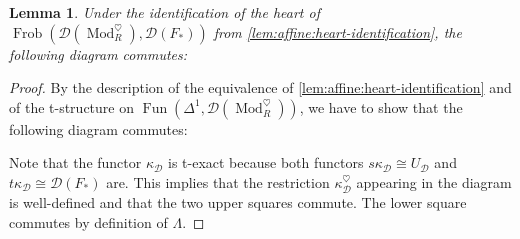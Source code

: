 \documentclass{article}
\theoremstyle{definition}
\theoremstyle{definition}
\theoremstyle{definition}
\theoremstyle{plain}
\newtheorem{lem}[defn]{Lemma}
\theoremstyle{plain}
\theoremstyle{plain}
\theoremstyle{plain}
\theoremstyle{plain}
\theoremstyle{plain}
\theoremstyle{plain}
\theoremstyle{plain}
\theoremstyle{remark}
\theoremstyle{remark}
\theoremstyle{plain}
\theoremstyle{plain}
\theoremstyle{plain}
\theoremstyle{plain}
\theoremstyle{plain}
\newcommand{\ModDisc}[1]{\operatorname{Mod}_{#1}^{\heartsuit}}
\newcommand{\Frob}[2]{\operatorname{Frob}(#1, #2)}
\newcommand{\Cat}[1]{\mathcal{#1}}
\newcommand{\Fun}[2]{\operatorname{Fun}({#1},{#2})}
\begin{document}
\begin{lem} \label{lem:affine:kappa-heart}
    Under the identification of the heart of $\Frob{\Cat D(\ModDisc{R})}{\Cat D(F_*)}$ from \cref{lem:affine:heart-identification},
    the following diagram commutes:
    \begin{center}
    \end{center}
\end{lem}
\begin{proof}
    By the description of the equivalence of \cref{lem:affine:heart-identification} and of the t-structure on $\Fun{\Delta^1}{\Cat D(\ModDisc{R})}$, 
    we have to show that the following diagram commutes:
    \begin{center}
    \end{center}
    Note that the functor $\kappa_{\Cat D}$ is t-exact because both functors $s\kappa_{\Cat D} \cong U_{\Cat D}$ and $t\kappa_{\Cat D} \cong \Cat D(F_*)$ are.
    This implies that the restriction $\kappa_{\Cat D}^\heartsuit$ appearing in the diagram is well-defined and that the two upper squares commute.
    The lower square commutes by definition of $\Lambda$.
\end{proof}
\end{document}
